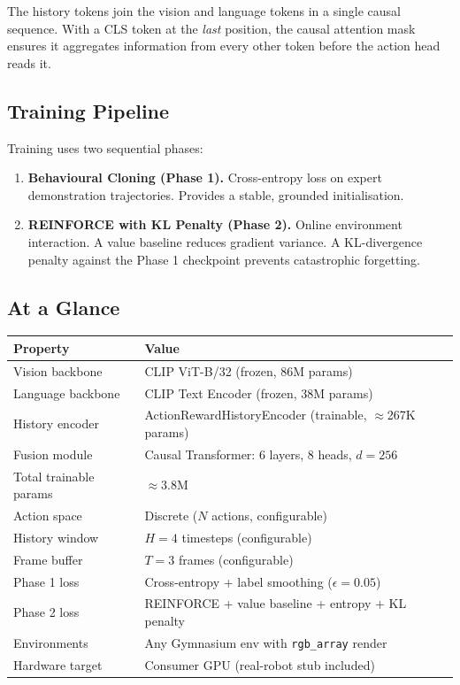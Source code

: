 \documentclass[12pt, a4paper]{article}
\begin{document}
The history tokens join the vision and language tokens in a single causal
sequence.
With a CLS token at the \emph{last} position, the causal attention mask
ensures it aggregates information from every other token before the action
head reads it.

\subsection*{Training Pipeline}

Training uses two sequential phases:
\begin{enumerate}[leftmargin=1.5em, itemsep=2pt]
  \item \textbf{Behavioural Cloning (Phase 1).}
        Cross-entropy loss on expert demonstration trajectories.
        Provides a stable, grounded initialisation.
  \item \textbf{REINFORCE with KL Penalty (Phase 2).}
        Online environment interaction. A value baseline reduces gradient
        variance. A KL-divergence penalty against the Phase 1 checkpoint
        prevents catastrophic forgetting.
\end{enumerate}

\subsection*{At a Glance}

\begin{table}[h]
\centering
\begin{tabular}{L{5.5cm} L{7.5cm}}
\toprule
\textbf{Property} & \textbf{Value} \\
\midrule
Vision backbone      & CLIP ViT-B/32 (frozen, 86M params) \\
Language backbone    & CLIP Text Encoder (frozen, 38M params) \\
History encoder      & ActionRewardHistoryEncoder (trainable, $\approx$267K params) \\
Fusion module        & Causal Transformer: 6 layers, 8 heads, $d=256$ \\
Total trainable params & $\approx$3.8M \\
Action space         & Discrete ($N$ actions, configurable) \\
History window       & $H = 4$ timesteps (configurable) \\
Frame buffer         & $T = 3$ frames (configurable) \\
Phase 1 loss         & Cross-entropy + label smoothing ($\epsilon = 0.05$) \\
Phase 2 loss         & REINFORCE + value baseline + entropy + KL penalty \\
Environments         & Any Gymnasium env with \texttt{rgb\_array} render \\
Hardware target      & Consumer GPU (real-robot stub included) \\
\bottomrule
\end{tabular}
\end{table}
\end{document}
